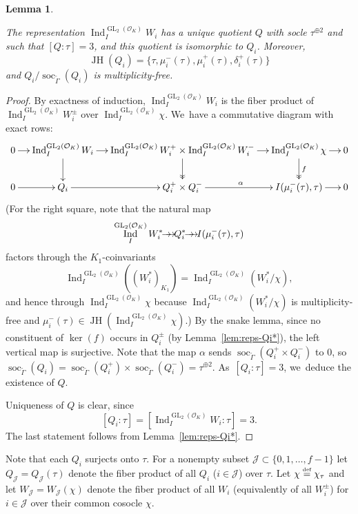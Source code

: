 \documentclass[JEP,XML,SOM,Unicode,NoFloatCountersInSection, NoEqCountersInSection,published]{cedram}
\newcommand{\onto}{\mathchoice{\to\hspace*{-5mm}\to}{\mathrel{\hbox{$\to\hspace*{-2.85mm}\to$}}}{\to\hspace*{-3mm}\to}{\to\hspace*{-3mm}\to}}
\let\wt\widetilde
\newcommand{\defeq}{\stackrel{\textrm{\tiny{\upshape{def}}}}{=}}
\newcommand{\cJ}{{\mathcal{J}}}
\newcommand{\cO}{\mathcal{O}}
\DeclareMathOperator{\GL}{GL}
\DeclareMathOperator{\Ind}{Ind}
\DeclareMathOperator{\JH}{\mathrm{JH}}
\DeclareMathOperator{\soc}{soc}
\theoremstyle{plain}
\newtheorem{lem}[prop]{Lemma}
\theoremstyle{definition}
\begin{document}
\begin{lem}\label{lem:rep-Qi}

The representation $\Ind_I^{\GL_2(\cO_K)} W_i$ has a unique quotient $Q$ with socle $\tau^{\oplus 2}$ and such that $[Q:\tau] = 3$, and this quotient is isomorphic to $Q_i$.
Moreover,
\[
\JH(Q_i) = \{\tau, \mu_i^-(\tau), \mu_i^+(\tau), \delta_i^+(\tau)\}
\]
and $Q_i/\soc_{\wt\Gamma}(Q_i)$ is multiplicity-free.
\end{lem}

\skpt
\begin{proof}
By exactness of induction, $\Ind_I^{\GL_2(\cO_K)} W_i$ is the fiber product of $\Ind_I^{\GL_2(\cO_K)} W_i^{\pm}$ over $\Ind_I^{\GL_2(\cO_K)} \chi$. We~have a commutative diagram with exact rows:
\begin{equation*}
\xymatrix@C=.4cm@R=.7cm{
0 \ar[r] & \Ind_I^{\GL_2(\cO_K)} W_i \ar[r]\ar[d] & \Ind_I^{\GL_2(\cO_K)} W_i^{+} \times \Ind_I^{\GL_2(\cO_K)} W_i^{-} \ar[r]\ar@{->>}[d] & \Ind_I^{\GL_2(\cO_K)} \chi\ar@{->>}^f[d] \ar[r] & 0 \\
0 \ar[r] & Q_i \ar[r] & Q_i^+ \times Q_i^- \ar^{\alpha}[r] & I(\mu_i^-(\tau),\tau) \ar[r] & 0
}
\end{equation*}
(For the right square, note that the natural map
\[
\Ind_I^{\GL_2(\cO_K)} W_i^* \onto Q_i^* \onto I(\mu_i^-(\tau),\tau)
\]
factors through the $K_1$-coinvariants
\[
\Ind_I^{\GL_2(\cO_K)} ((W_i^*)_{K_1}) = \Ind_I^{\GL_2(\cO_K)} (W_i^*/\chi),
\]
and hence through $\Ind_I^{\GL_2(\cO_K)} \chi$ because $\Ind_I^{\GL_2(\cO_K)} (W_i^*/\chi)$ is multiplicity-free and $\mu_i^-(\tau) \in \JH(\Ind_I^{\GL_2(\cO_K)} \chi)$.)
By the snake lemma, since no constituent of $\ker(f)$ occurs in $Q_i^\pm$ (by Lemma~\ref{lem:reps-Qi*}), the left vertical map is surjective.
Note that the map $\alpha$ sends $\soc_{\wt\Gamma}(Q_i^+ \times Q_i^-)$ to $0$, so~$\soc_{\wt\Gamma}(Q_i) = \soc_{\wt\Gamma}(Q_i^+) \times \soc_{\wt\Gamma}(Q_i^-) = \tau^{\oplus 2}$. As~$[Q_i:\tau] = 3$, we~deduce the existence of $Q$.

Uniqueness of $Q$ is clear, since
\[
[Q_i:\tau] = [\Ind_I^{\GL_2(\cO_K)} W_i:\tau] = 3.
\]
The last statement follows from Lemma~\ref{lem:reps-Qi*}.
\end{proof}

Note that each $Q_i$ surjects onto $\tau$.
For a nonempty subset $\cJ \subset \{0,1,\dots,f-1\}$ let $Q_\cJ = Q_\cJ(\tau)$ denote the fiber product of all $Q_i$ ($i \in \cJ$) over $\tau$.
Let $\chi \defeq \chi_\tau$ and let $W_\cJ = W_\cJ(\chi)$
denote the fiber product of all $W_i$ (equivalently of all $W_i^\pm$) for $i \in \cJ$ over their common cosocle $\chi$.
\end{document}
